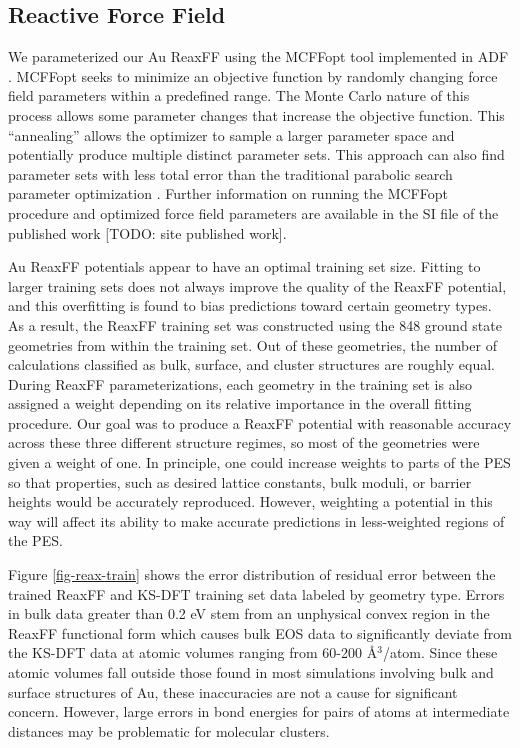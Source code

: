 \documentclass[12pt]{cmuthesis}
\begin{document}
\subsection{Reactive Force Field}
\label{sec:orgd2ab9e5}
We parameterized our Au ReaxFF using the MCFFopt tool implemented in ADF \cite{velde-2001-chemis-adf,iype-2013-param-monte}. MCFFopt seeks to minimize an objective function by randomly changing force field parameters within a predefined range. The Monte Carlo nature of this process allows some parameter changes that increase the objective function. This ``annealing'' allows the optimizer to sample a larger parameter space and potentially produce multiple distinct parameter sets. This approach can also find parameter sets with less total error than the traditional parabolic search parameter optimization \cite{iype-2013-param-monte}. Further information on running the MCFFopt procedure and optimized force field parameters are available in the SI file of the published work [TODO: site published work].

Au ReaxFF potentials appear to have an optimal training set size. Fitting to larger training sets does not always improve the quality of the ReaxFF potential, and this overfitting is found to bias predictions toward certain geometry types. As a result, the ReaxFF training set was constructed using the 848 ground state geometries from within the training set. Out of these geometries, the number of calculations classified as bulk, surface, and cluster structures are roughly equal. During ReaxFF parameterizations, each geometry in the training set is also assigned a weight depending on its relative importance in the overall fitting procedure. Our goal was to produce a ReaxFF potential with reasonable accuracy across these three different structure regimes, so most of the geometries were given a weight of one. In principle, one could increase weights to parts of the PES so that properties, such as desired lattice constants, bulk moduli, or barrier heights would be accurately reproduced. However, weighting a potential in this way will affect its ability to make accurate predictions in less-weighted regions of the PES.

Figure \ref{fig-reax-train} shows the error distribution of residual error between the trained ReaxFF and KS-DFT training set data labeled by geometry type. Errors in bulk data greater than 0.2 eV stem from an unphysical convex region in the ReaxFF functional form which causes bulk EOS data to significantly deviate from the KS-DFT data at atomic volumes ranging from 60-200 \AA{}\(^{\text{3}}\)/atom. Since these atomic volumes fall outside those found in most simulations involving bulk and surface structures of Au, these inaccuracies are not a cause for significant concern. However, large errors in bond energies for pairs of atoms at intermediate distances may be problematic for molecular clusters.
\end{document}
